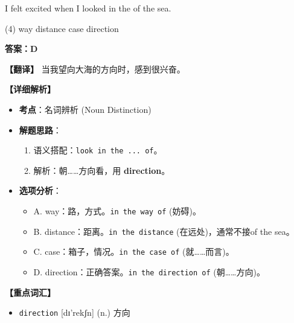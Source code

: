 \documentclass[11pt, a4paper]{article}
\newcommand{\analysis}[4]{
    \begin{solutionbox}
        \textbf{答案：#1}
        
        \textbf{【翻译】} #2
        
        \textbf{【详细解析】}
        #3
        
        \textbf{【重点词汇】}
        #4
    \end{solutionbox}
}
\newcommand{\blank}{\underline{\hspace{1.5cm}}}
\begin{document}
\begin{questions}
    \item I felt excited when I looked in the \blank of the sea.
    \begin{tasks}(4)
        \task way \task distance \task case \task direction
    \end{tasks}
    \analysis{D}{当我望向大海的方向时，感到很兴奋。}{
        \begin{itemize}
            \item \textbf{考点}：名词辨析 (Noun Distinction)
            \item \textbf{解题思路}：
                \begin{enumerate}
                    \item 语义搭配：\texttt{look in the ... of}。
                    \item 解析：朝……方向看，用 \textbf{direction}。
                \end{enumerate}
            \item \textbf{选项分析}：
                \begin{itemize}
                    \item A. way：路，方式。\texttt{in the way of} (妨碍)。
                    \item B. distance：距离。\texttt{in the distance} (在远处)，通常不接of the sea。
                    \item C. case：箱子，情况。\texttt{in the case of} (就……而言)。
                    \item D. direction：正确答案。\texttt{in the direction of} (朝……方向)。
                \end{itemize}
        \end{itemize}
    }{
        \begin{itemize}
            \item \texttt{direction} [dɪ'rekʃn] (n.) 方向
        \end{itemize}
    }


\end{questions}
\end{document}
